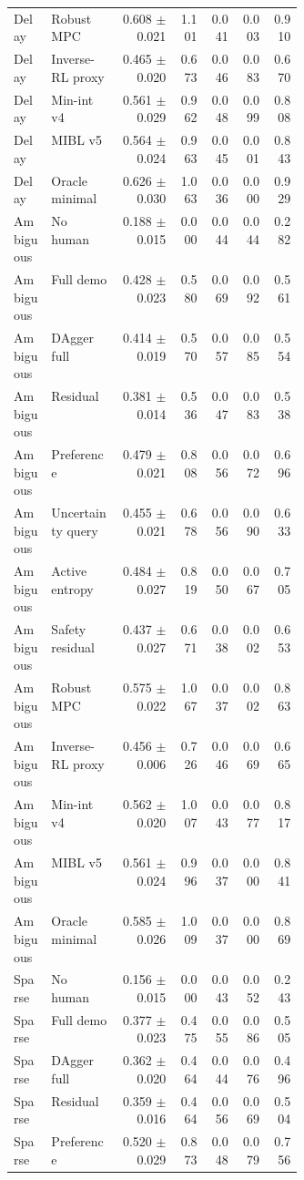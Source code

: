 \documentclass{article}
\begin{document}
\begin{center}
\begin{longtable}{p{0.13\linewidth}p{0.24\linewidth}rrrrr}
Delay & Robust MPC & 0.608 $\pm$ 0.021 & 1.101 & 0.041 & 0.003 & 0.910\\
Delay & Inverse-RL proxy & 0.465 $\pm$ 0.020 & 0.673 & 0.046 & 0.083 & 0.670\\
Delay & Min-int v4 & 0.561 $\pm$ 0.029 & 0.962 & 0.048 & 0.099 & 0.808\\
Delay & MIBL v5 & 0.564 $\pm$ 0.024 & 0.963 & 0.045 & 0.001 & 0.843\\
Delay & Oracle minimal & 0.626 $\pm$ 0.030 & 1.063 & 0.036 & 0.000 & 0.929\\
Ambiguous & No human & 0.188 $\pm$ 0.015 & 0.000 & 0.044 & 0.044 & 0.282\\
Ambiguous & Full demo & 0.428 $\pm$ 0.023 & 0.580 & 0.069 & 0.092 & 0.561\\
Ambiguous & DAgger full & 0.414 $\pm$ 0.019 & 0.570 & 0.057 & 0.085 & 0.554\\
Ambiguous & Residual & 0.381 $\pm$ 0.014 & 0.536 & 0.047 & 0.083 & 0.538\\
Ambiguous & Preference & 0.479 $\pm$ 0.021 & 0.808 & 0.056 & 0.072 & 0.696\\
Ambiguous & Uncertainty query & 0.455 $\pm$ 0.021 & 0.678 & 0.056 & 0.090 & 0.633\\
Ambiguous & Active entropy & 0.484 $\pm$ 0.027 & 0.819 & 0.050 & 0.067 & 0.705\\
Ambiguous & Safety residual & 0.437 $\pm$ 0.027 & 0.671 & 0.038 & 0.002 & 0.653\\
Ambiguous & Robust MPC & 0.575 $\pm$ 0.022 & 1.067 & 0.037 & 0.002 & 0.863\\
Ambiguous & Inverse-RL proxy & 0.456 $\pm$ 0.006 & 0.726 & 0.046 & 0.069 & 0.665\\
Ambiguous & Min-int v4 & 0.562 $\pm$ 0.020 & 1.007 & 0.043 & 0.077 & 0.817\\
Ambiguous & MIBL v5 & 0.561 $\pm$ 0.024 & 0.996 & 0.037 & 0.000 & 0.841\\
Ambiguous & Oracle minimal & 0.585 $\pm$ 0.026 & 1.009 & 0.037 & 0.000 & 0.869\\
Sparse & No human & 0.156 $\pm$ 0.015 & 0.000 & 0.043 & 0.052 & 0.243\\
Sparse & Full demo & 0.377 $\pm$ 0.023 & 0.475 & 0.055 & 0.086 & 0.505\\
Sparse & DAgger full & 0.362 $\pm$ 0.020 & 0.464 & 0.044 & 0.076 & 0.496\\
Sparse & Residual & 0.359 $\pm$ 0.016 & 0.464 & 0.056 & 0.069 & 0.504\\
Sparse & Preference & 0.520 $\pm$ 0.029 & 0.873 & 0.048 & 0.079 & 0.756\\

\end{longtable}
\end{center}
\end{document}
